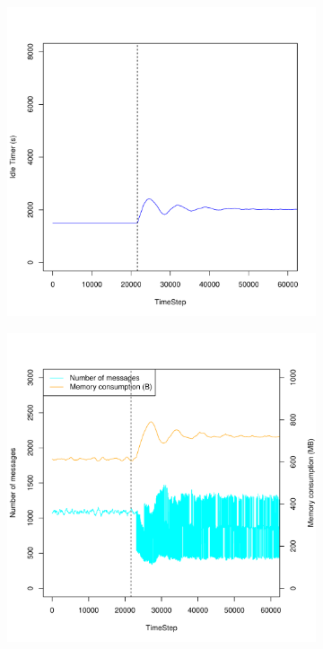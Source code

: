 \documentclass[a4j]{ujarticle}
\begin{document}
\begin{figure}[htbp]
\begin{subfigure}{0.49\hsize}
   \includegraphics[width=1.0\hsize]{scenario_6_idleTimer_86400_345600_1-35_0-000203_0_0_ideal.pdf}
   \label{subfig:scenario_6_idleTimer_86400_345600_1-35_0-000203_0_0_ideal}
 \end{subfigure}
 \par\bigskip %
 \begin{subfigure}{0.49\hsize}
   \centering
   \includegraphics[width=1.0\hsize]{scenario_6_signaling_and_memoryload_vs_timeStep_86400_345600_1-35_0-000203_0_0_ideal.pdf}

\end{subfigure}
\end{figure}
\end{document}

